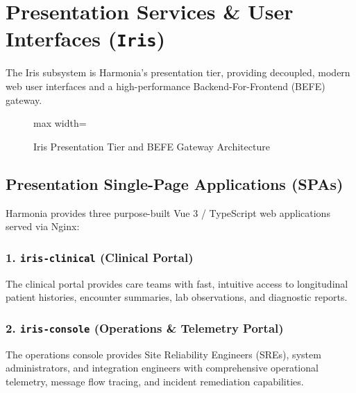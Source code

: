 
\chapter{Presentation Services \& User Interfaces (\texttt{Iris})}
\label{chap:presentation_iris}

The Iris subsystem is Harmonia's presentation tier, providing decoupled, modern web user interfaces and a high-performance Backend-For-Frontend (BEFE) gateway.

\begin{figure}[htbp]
    \centering
    \begin{adjustbox}{max width=\textwidth}
        
    \end{adjustbox}
    \caption{Iris Presentation Tier and BEFE Gateway Architecture}
    \label{fig:iris_presentation_tier}
\end{figure}

\section{Presentation Single-Page Applications (SPAs)}

Harmonia provides three purpose-built Vue 3 / TypeScript web applications served via Nginx:

\subsection{1. \texttt{iris-clinical} (Clinical Portal)}
The clinical portal provides care teams with fast, intuitive access to longitudinal patient histories, encounter summaries, lab observations, and diagnostic reports.

\subsection{2. \texttt{iris-console} (Operations \& Telemetry Portal)}
The operations console provides Site Reliability Engineers (SREs), system administrators, and integration engineers with comprehensive operational telemetry, message flow tracing, and incident remediation capabilities.

